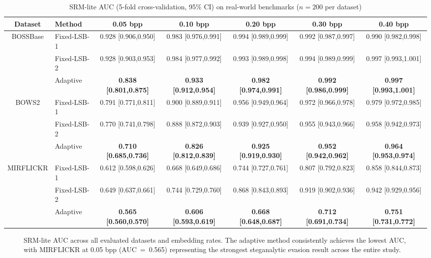 \begin{table}[H]
\centering
\caption{SRM-lite AUC (5-fold cross-validation, 95\% CI) on real-world benchmarks ($n = 200$ per dataset)}
\label{tab:srm_real}
\begin{adjustbox}{max width=\textwidth}
\begin{tabular}{clccccc}
\toprule
Dataset & Method & 0.05 bpp & 0.10 bpp & 0.20 bpp & 0.30 bpp & 0.40 bpp \\
\midrule
\multirow{3}{*}{BOSSBase}  & Fixed-LSB-1 & 0.928 [0.906,0.950] & 0.983 [0.976,0.991] & 0.994 [0.989,0.999] & 0.992 [0.987,0.997] & 0.990 [0.982,0.998] \\
                            & Fixed-LSB-2 & 0.928 [0.903,0.953] & 0.984 [0.977,0.992] & 0.993 [0.989,0.998] & 0.994 [0.989,0.999] & 0.997 [0.993,1.001] \\
                            & Adaptive    & \textbf{0.838 [0.801,0.875]} & \textbf{0.933 [0.912,0.954]} & \textbf{0.982 [0.974,0.991]} & \textbf{0.992 [0.986,0.999]} & \textbf{0.997 [0.993,1.001]} \\
\midrule
\multirow{3}{*}{BOWS2}     & Fixed-LSB-1 & 0.791 [0.771,0.811] & 0.900 [0.889,0.911] & 0.956 [0.949,0.964] & 0.972 [0.966,0.978] & 0.979 [0.972,0.985] \\
                            & Fixed-LSB-2 & 0.770 [0.741,0.798] & 0.888 [0.872,0.903] & 0.939 [0.927,0.950] & 0.955 [0.943,0.966] & 0.958 [0.942,0.973] \\
                            & Adaptive    & \textbf{0.710 [0.685,0.736]} & \textbf{0.826 [0.812,0.839]} & \textbf{0.925 [0.919,0.930]} & \textbf{0.952 [0.942,0.962]} & \textbf{0.964 [0.953,0.974]} \\
\midrule
\multirow{3}{*}{MIRFLICKR} & Fixed-LSB-1 & 0.612 [0.598,0.626] & 0.668 [0.649,0.686] & 0.744 [0.727,0.761] & 0.807 [0.792,0.823] & 0.858 [0.844,0.873] \\
                            & Fixed-LSB-2 & 0.649 [0.637,0.661] & 0.744 [0.729,0.760] & 0.868 [0.843,0.893] & 0.919 [0.902,0.936] & 0.942 [0.929,0.956] \\
                            & Adaptive    & \textbf{0.565 [0.560,0.570]} & \textbf{0.606 [0.593,0.619]} & \textbf{0.668 [0.648,0.687]} & \textbf{0.712 [0.691,0.734]} & \textbf{0.751 [0.731,0.772]} \\
\bottomrule
\end{tabular}
\end{adjustbox}
\end{table}

\begin{figure}[H]
    \centering
    \caption{SRM-lite AUC across all evaluated datasets and embedding rates. The adaptive method consistently achieves the lowest AUC, with MIRFLICKR at 0.05 bpp (AUC~=~0.565) representing the strongest steganalytic evasion result across the entire study.}
    \label{fig:srm_auc_real}
\end{figure}

